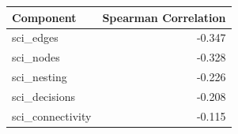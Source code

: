 \begin{tabular}{lr}
\toprule
Component & Spearman Correlation \\
\midrule
sci_edges & -0.347 \\
sci_nodes & -0.328 \\
sci_nesting & -0.226 \\
sci_decisions & -0.208 \\
sci_connectivity & -0.115 \\
\bottomrule
\end{tabular}

